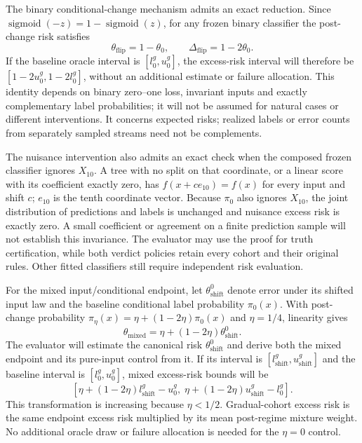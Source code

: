 \documentclass[11pt,a4paper]{article}
\begin{document}
The binary conditional-change mechanism admits an exact reduction. Since
$\operatorname{sigmoid}(-z)=1-\operatorname{sigmoid}(z)$, for any frozen
binary classifier the post-change risk satisfies
\begin{equation}
\theta_{\mathrm{flip}}=1-\theta_0,\qquad
\Delta_{\mathrm{flip}}=1-2\theta_0.
\end{equation}
If the baseline oracle interval is $[l_0^g,u_0^g]$, the excess-risk interval
will therefore be $[1-2u_0^g,1-2l_0^g]$, without an additional estimate or
failure allocation. This identity depends on binary zero--one loss, invariant
inputs and exactly complementary label probabilities; it will not be assumed
for natural cases or different interventions. It concerns expected risks;
realized labels or error counts from separately sampled streams need not be
complements.

The nuisance intervention also admits an exact check when the composed frozen
classifier ignores $X_{10}$. A tree with no split on that coordinate, or a
linear score with its coefficient exactly zero, has
$f(x+ce_{10})=f(x)$ for every input and shift $c$; $e_{10}$ is the tenth
coordinate vector. Because $\pi_0$ also ignores $X_{10}$, the joint
distribution of predictions and labels is unchanged and nuisance excess risk
is exactly zero. A small coefficient or agreement on a finite prediction
sample will not establish this invariance. The evaluator may use the proof
for truth certification, while both verdict policies retain every cohort and
their original rules. Other fitted classifiers still require independent
risk evaluation.

For the mixed input/conditional endpoint, let $\theta_{\mathrm{shift}}^0$
denote error under its shifted input law and the baseline conditional label
probability $\pi_0(x)$. With post-change probability
$\pi_\eta(x)=\eta+(1-2\eta)\pi_0(x)$ and $\eta=1/4$, linearity gives
\begin{equation}
\theta_{\mathrm{mixed}}=\eta+(1-2\eta)\theta_{\mathrm{shift}}^0.
\end{equation}
The evaluator will estimate the canonical risk $\theta_{\mathrm{shift}}^0$
and derive both the mixed endpoint and its pure-input control from it.
If its interval is $[l_{\mathrm{shift}}^g,u_{\mathrm{shift}}^g]$ and the
baseline interval is $[l_0^g,u_0^g]$, mixed excess-risk bounds will be
\begin{equation}
\left[\eta+(1-2\eta)l_{\mathrm{shift}}^g-u_0^g,\;
      \eta+(1-2\eta)u_{\mathrm{shift}}^g-l_0^g\right].
\end{equation}
This transformation is increasing because $\eta<1/2$. Gradual-cohort
excess risk is the same endpoint excess risk multiplied by its mean
post-regime mixture weight. No additional oracle draw or failure allocation
is needed for the $\eta=0$ control.
\end{document}
